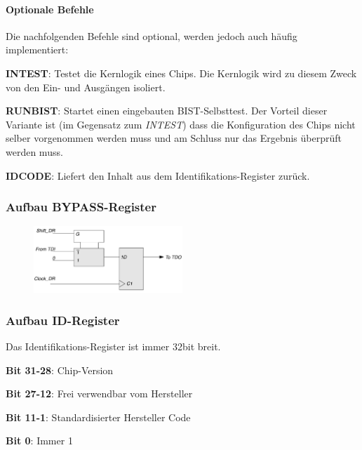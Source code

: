 \paragraph{Optionale Befehle}
Die nachfolgenden Befehle sind optional, werden jedoch auch häufig implementiert:
\begin{compactitem}
    \item \textbf{INTEST}: Testet die Kernlogik eines Chips. Die Kernlogik wird zu diesem Zweck von den Ein- und Ausgängen isoliert.
    \item \textbf{RUNBIST}: Startet einen eingebauten BIST-Selbsttest. Der Vorteil dieser Variante ist (im Gegensatz zum \textit{INTEST}) dass die Konfiguration des Chips nicht selber vorgenommen werden muss und am Schluss nur das Ergebnis überprüft werden muss.
    \item \textbf{IDCODE}: Liefert den Inhalt aus dem Identifikations-Register zurück.
\end{compactitem}
\begin{multicols}{2}
\subsubsection{Aufbau BYPASS-Register}
\begin{figure}[H]
    \includegraphics[width=0.5\textwidth]{images/bst_bypassregister.png}
\end{figure}

\subsubsection{Aufbau ID-Register}
Das Identifikations-Register ist immer 32bit breit.
\begin{compactitem}
    \item \textbf{Bit 31-28}: Chip-Version
    \item \textbf{Bit 27-12}: Frei verwendbar vom Hersteller
    \item \textbf{Bit 11-1}: Standardisierter Hersteller Code
    \item \textbf{Bit 0}: Immer 1
\end{compactitem}
\end{multicols}

